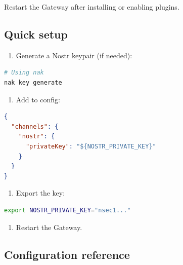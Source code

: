 Restart the Gateway after installing or enabling plugins.

\subsection{Quick setup}


\begin{enumerate}
  \item Generate a Nostr keypair (if needed):
\end{enumerate}


\begin{lstlisting}[language=bash]
# Using nak
nak key generate
\end{lstlisting}


\begin{enumerate}
  \item Add to config:
\end{enumerate}


\begin{lstlisting}[language=json]
{
  "channels": {
    "nostr": {
      "privateKey": "${NOSTR_PRIVATE_KEY}"
    }
  }
}
\end{lstlisting}


\begin{enumerate}
  \item Export the key:
\end{enumerate}


\begin{lstlisting}[language=bash]
export NOSTR_PRIVATE_KEY="nsec1..."
\end{lstlisting}


\begin{enumerate}
  \item Restart the Gateway.
\end{enumerate}


\subsection{Configuration reference}



